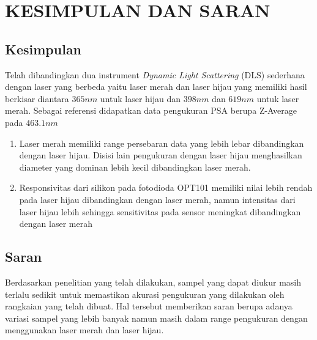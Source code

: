 \chapter{KESIMPULAN DAN SARAN}

\section{Kesimpulan}
Telah dibandingkan dua instrument \textit{Dynamic Light Scattering} (DLS) sederhana dengan
laser yang berbeda yaitu laser merah dan laser hijau yang memiliki hasil berkisar diantara
${365 nm}$ untuk laser hijau dan ${398 nm}$ dan ${619 nm}$ untuk laser merah.
Sebagai referensi didapatkan data pengukuran PSA berupa Z-Average pada ${463.1 nm}$
\begin{enumerate}
    \item Laser merah memiliki range persebaran data yang lebih lebar dibandingkan
    dengan laser hijau. Disisi lain pengukuran dengan laser hijau menghasilkan diameter yang
    dominan lebih kecil dibandingkan laser merah.
    \item Responsivitas dari silikon pada fotodioda OPT101 memiliki nilai lebih rendah
    pada laser hijau dibandingkan dengan laser merah, namun intensitas dari laser hijau lebih
    sehingga sensitivitas pada sensor meningkat dibandingkan dengan laser merah
\end{enumerate}


\section{Saran}
Berdasarkan penelitian yang telah dilakukan, sampel yang dapat diukur masih terlalu
sedikit untuk memastikan akurasi pengukuran yang dilakukan oleh rangkaian yang telah
dibuat. Hal tersebut memberikan saran berupa adanya variasi sampel yang lebih banyak
namun masih dalam range pengukuran dengan menggunakan laser merah dan laser hijau.